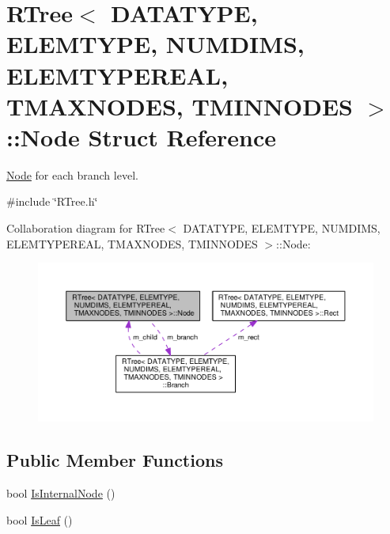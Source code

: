\hypertarget{structRTree_1_1Node}{\section{R\-Tree$<$ D\-A\-T\-A\-T\-Y\-P\-E, E\-L\-E\-M\-T\-Y\-P\-E, N\-U\-M\-D\-I\-M\-S, E\-L\-E\-M\-T\-Y\-P\-E\-R\-E\-A\-L, T\-M\-A\-X\-N\-O\-D\-E\-S, T\-M\-I\-N\-N\-O\-D\-E\-S $>$\-:\-:Node Struct Reference}
\label{structRTree_1_1Node}
}


\hyperlink{structRTree_1_1Node}{Node} for each branch level.  




{\ttfamily \#include \char`\"{}R\-Tree.\-h\char`\"{}}



Collaboration diagram for R\-Tree$<$ D\-A\-T\-A\-T\-Y\-P\-E, E\-L\-E\-M\-T\-Y\-P\-E, N\-U\-M\-D\-I\-M\-S, E\-L\-E\-M\-T\-Y\-P\-E\-R\-E\-A\-L, T\-M\-A\-X\-N\-O\-D\-E\-S, T\-M\-I\-N\-N\-O\-D\-E\-S $>$\-:\-:Node\-:\nopagebreak
\begin{figure}[H]
\begin{center}
\leavevmode
\includegraphics[width=350pt]{structRTree_1_1Node__coll__graph}
\end{center}
\end{figure}
\subsection*{Public Member Functions}
\begin{DoxyCompactItemize}
\item 
bool \hyperlink{structRTree_1_1Node_a6a330138c4d6e2280ac16770cdfcaf09}{Is\-Internal\-Node} ()
\item 
bool \hyperlink{structRTree_1_1Node_a3e34e35a8482978d456885d4bac76de4}{Is\-Leaf} ()
\end{DoxyCompactItemize}
